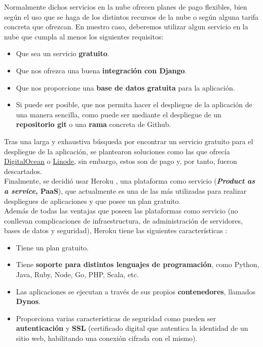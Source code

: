 Normalmente dichos servicios en la nube ofrecen planes de pago flexibles, bien según
el uso que se haga de los distintos recursos de la nube o según alguna tarifa concreta
que ofrezcan. En nuestro caso, deberemos utilizar algun servicio en la nube que cumpla
al menos los siguientes requisitos:

    \begin{itemize}
        \item Que sea un servicio \textbf{gratuito}.
        \item Que nos ofrezca una buena \textbf{integración con Django}.
        \item Que nos proporcione una \textbf{base de datos gratuita} para la aplicación.
        \item Si puede ser posible, que nos permita hacer el despliegue de la
        aplicación de una manera sencilla, como puede ser mediante el despliegue de un
        \textbf{repositorio git} o una \textbf{rama} concreta de Github. 
    \end{itemize}

Tras una larga y exhaustiva búsqueda por encontrar un servicio gratuito para el
despliegue de la aplicación, se plantearon soluciones como las que ofrecía
\href{https://docs.digitalocean.com/tutorials/app-deploy-django-app/}{DigitalOcean}
o \href{https://www.linode.com/docs/products/tools/marketplace/guides/django/}{Linode},
sin embargo, estos son de pago y, por tanto, fueron descartados.\\

Finalmente, se decidió usar Heroku \cite{heroku}, una plataforma como servicio
(\textbf{\textit{Product as a service}, PaaS}), que actualmente es una de las más
utilizadas para realizar despliegues de aplicaciones y que posee un plan gratuito.\\

Además de todas las ventajas que poseen las plataformas como servicio (no conllevan
complicaciones de infraestructura, de administración de servidores, bases de datos y
seguridad), Heroku tiene las siguientes características \cite{heroku-features}:

    \begin{itemize}
        \item Tiene un plan gratuito.
        \item Tiene \textbf{soporte para distintos lenguajes de programación}, como Python,
        Java, Ruby, Node, Go, PHP, Scala, etc.
        \item Las aplicaciones se ejecutan a través de sus propios \textbf{contenedores},
        llamados \textbf{Dynos}.
        \item Proporciona varias características de seguridad como pueden ser
        \textbf{autenticación} y \textbf{SSL} (certificado digital que autentica la
        identidad de un sitio web, habilitando una conexión cifrada con el mismo).
    \end{itemize}

